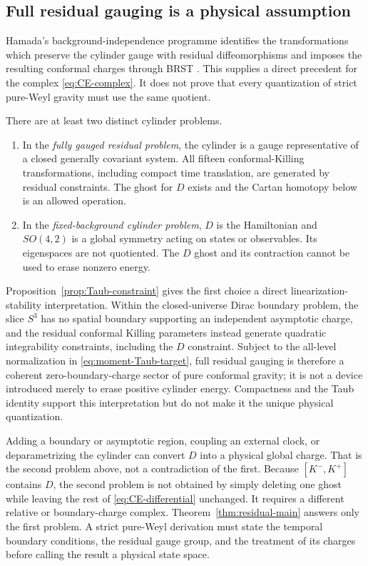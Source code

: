 \documentclass[11pt]{article}
\theoremstyle{definition}
\theoremstyle{remark}
\begin{document}
\subsection{Full residual gauging is a physical assumption}\label{sec:D-gauge}

Hamada's background-independence programme identifies the transformations
which preserve the cylinder gauge with residual diffeomorphisms and imposes
the resulting conformal charges through BRST
\cite{HamadaCFT,HamadaBRST}.  This supplies a direct precedent for the
complex \eqref{eq:CE-complex}.  It does not prove that every quantization of
strict pure-Weyl gravity must use the same quotient.

There are at least two distinct cylinder problems.
\begin{enumerate}
\item In the \emph{fully gauged residual problem}, the cylinder is a gauge
representative of a closed generally covariant system.  All fifteen
conformal-Killing transformations, including compact time translation, are
generated by residual constraints.  The ghost for $D$ exists and the Cartan
homotopy below is an allowed operation.
\item In the \emph{fixed-background cylinder problem}, $D$ is the
Hamiltonian and $SO(4,2)$ is a global symmetry acting on states or
observables.  Its eigenspaces are not quotiented.  The $D$ ghost and its
contraction cannot be used to erase nonzero energy.
\end{enumerate}
Proposition~\ref{prop:Taub-constraint} gives the first choice a direct
linearization-stability interpretation.  Within the closed-universe Dirac
boundary problem, the slice $S^3$ has no spatial boundary supporting an
independent asymptotic charge, and the residual conformal Killing parameters
instead generate quadratic integrability constraints, including the $D$
constraint.  Subject to the all-level normalization in
\eqref{eq:moment-Taub-target}, full residual gauging is therefore a coherent
zero-boundary-charge sector of pure conformal gravity; it is not a device
introduced merely to erase positive cylinder energy.  Compactness and the
Taub identity support this interpretation but do not make it the unique
physical quantization.

Adding a boundary or asymptotic region, coupling an external clock, or
deparametrizing the cylinder can convert $D$ into a physical global charge.
That is the second problem above, not a contradiction of the first.
Because $[K^-,K^+]$ contains $D$, the second problem is not obtained by
simply deleting one ghost while leaving the rest of
\eqref{eq:CE-differential} unchanged.  It requires a different relative or
boundary-charge complex.  Theorem~\ref{thm:residual-main} answers only the
first problem.  A strict pure-Weyl derivation must state the temporal
boundary conditions, the residual gauge group, and the treatment of its
charges before calling the result a physical state space.
\end{document}
